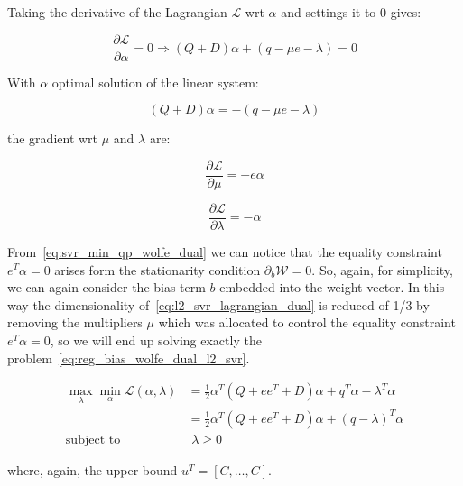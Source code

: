 Taking the derivative of the Lagrangian $\mathcal{L}$ wrt $\alpha$ and settings it to 0 gives:

\begin{equation} \label{eq:l2_svr_lagrangian_der_a}
	\frac{\partial \mathcal{L}}{\partial \alpha}=0\Rightarrow (Q+D) \alpha + (q - \mu e - \lambda) = 0
\end{equation}

With $\alpha$ optimal solution of the linear system:

\begin{equation} \label{eq:l2_svr_lagrangian_sol}
    (Q+D) \alpha = - (q - \mu e - \lambda)
\end{equation}

the gradient wrt $\mu$ and $\lambda$ are:

\begin{equation} \label{eq:l2_svr_lagrangian_der_mu}
	\frac{\partial \mathcal{L}}{\partial \mu}=-e \alpha
\end{equation}

\begin{equation} \label{eq:l2_svr_lagrangian_der_lalbda}
    \frac{\partial \mathcal{L}}{\partial \lambda}=-\alpha
\end{equation}

From~\eqref{eq:svr_min_qp_wolfe_dual} we can notice that the equality constraint $e^T \alpha = 0$ arises form the stationarity condition $\partial_{{b}} \mathcal{W}=0$. So, again, for simplicity, we can again consider the bias term $b$ embedded into the weight vector. In this way the dimensionality of~\eqref{eq:l2_svr_lagrangian_dual} is reduced of 1/3 by removing the multipliers $\mu$ which was allocated to control the equality constraint $e^T \alpha=0$, so we will end up solving exactly the problem~\eqref{eq:reg_bias_wolfe_dual_l2_svr}.

\begin{equation} \label{eq:l2_svr_lb_lagrangian_dual}
	\begin{aligned}
    	\max_{\lambda} \min_{\alpha} \mathcal{L}(\alpha,\lambda) &= \frac{1}{2} \alpha^T (Q + ee^T + D) \alpha+q^T\alpha - \lambda^T \alpha \\
    &= \frac{1}{2} \alpha^T (Q + ee^T + D)\alpha + (q - \lambda)^T \alpha \\
    \text{subject to} \quad & \,\, \lambda \geq 0
	\end{aligned}
\end{equation}

where, again, the upper bound $u^T = [C, \dots, C]$.

